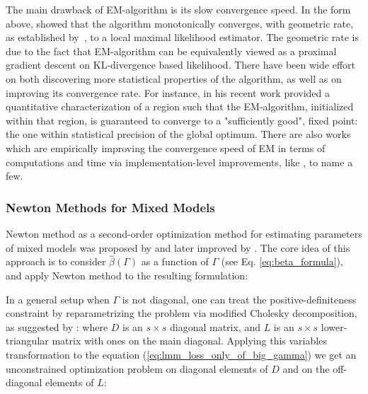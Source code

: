 \documentclass[11pt,letterpaper]{article}
\numberwithin{equation}{section} %
\numberwithin{figure}{section} %
\numberwithin{table}{section} %
\begin{document}
The main drawback of EM-algorithm is its slow convergence speed. In the form above, \cite{Dempster1977} showed that the algorithm monotonically converges, with geometric rate, as established by~\cite{Wu1983}, to a local maximal likelihood estimator. The geometric rate is due to the fact that EM-algorithm can be equivalently viewed as a proximal gradient descent on KL-divergence based likelihood. There have been wide effort on both discovering more statistical properties of the algorithm, as well as on improving its convergence rate. For instance, in his recent work \cite{Balakrishnan2017} provided a quantitative characterization of a region such that the EM-algorithm, initialized within that region, is guaranteed to converge to a "sufficiently good", fixed point: the one within statistical precision of the global optimum. There are also works which are empirically improving the convergence speed of EM in terms of computations and time via implementation-level improvements, like \cite{Liu1994, Liu1998}, to name a few.
 
\subsubsection{Newton Methods for Mixed Models}
\label{section:newton_methods_for_mixed_models}
Newton method as a second-order optimization method for estimating parameters of mixed models was proposed by \cite{Jennrich1986} and later improved by \cite{Lindstrom1988}. The core idea of this approach is to consider $\hat\beta(\Gamma)$ as a function of $\Gamma$ (see Eq. \ref{eq:beta_formula}), and apply Newton method to the resulting formulation:


In a general setup when $\Gamma$ is not diagonal, one can treat the positive-definiteness constraint by reparametrizing the problem via modified Cholesky decomposition, as suggested by \cite{Chen2003}:
where $D$ is an $s\times s$ diagonal matrix, and $L$ is an $s\times s$ lower-triangular matrix with ones on the main diagonal. Applying this variables transformation to the equation (\ref{eq:lmm_loss_only_of_big_gamma}) we get an unconstrained optimization problem on diagonal elements of $D$ and on the off-diagonal elements of $L$:

\end{document}
